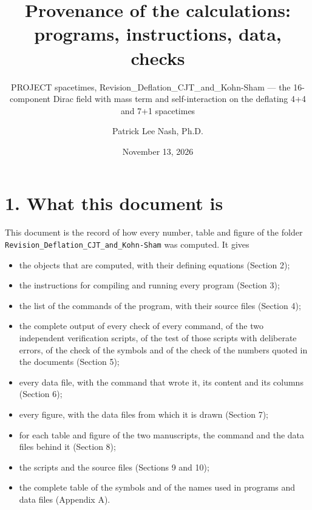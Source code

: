 \documentclass[
  10pt,
]{article}
\title{Provenance of the calculations: programs, instructions, data,
checks}
\subtitle{PROJECT spacetimes, Revision\_Deflation\_CJT\_and\_Kohn-Sham
--- the 16-component Dirac field with mass term and self-interaction on
the deflating 4+4 and 7+1 spacetimes}
\author{Patrick Lee Nash, Ph.D.}
\date{November 13, 2026}
\providecommand{\tightlist}{%
  \setlength{\itemsep}{0pt}\setlength{\parskip}{0pt}}
\begin{document}
\maketitle

\hypertarget{what-this-document-is}{%
\section{1. What this document is}\label{what-this-document-is}}

This document is the record of how every number, table and figure of the
folder \texttt{Revision\_Deflation\_CJT\_and\_Kohn-Sham} was computed.
It gives

\begin{itemize}
\tightlist
\item
  the objects that are computed, with their defining equations (Section
  2);
\item
  the instructions for compiling and running every program (Section 3);
\item
  the list of the commands of the program, with their source files
  (Section 4);
\item
  the complete output of every check of every command, of the two
  independent verification scripts, of the test of those scripts with
  deliberate errors, of the check of the symbols and of the check of the
  numbers quoted in the documents (Section 5);
\item
  every data file, with the command that wrote it, its content and its
  columns (Section 6);
\item
  every figure, with the data files from which it is drawn (Section 7);
\item
  for each table and figure of the two manuscripts, the command and the
  data files behind it (Section 8);
\item
  the scripts and the source files (Sections 9 and 10);
\item
  the complete table of the symbols and of the names used in programs
  and data files (Appendix A).
\end{itemize}
\end{document}
